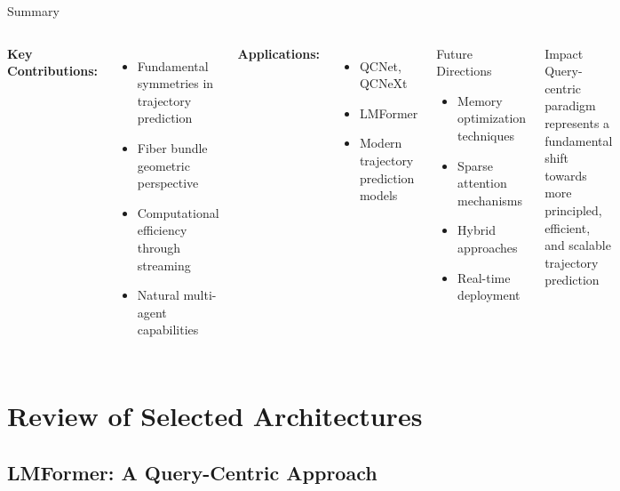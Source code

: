 \documentclass[10pt,aspectratio=169]{beamer}
\begin{document}
\begin{frame}{Summary}
\begin{columns}[T]
\textbf{Key Contributions:}
\begin{itemize}
    \item Fundamental symmetries in trajectory prediction
    \item Fiber bundle geometric perspective
    \item Computational efficiency through streaming
    \item Natural multi-agent capabilities
\end{itemize}

\textbf{Applications:}
\begin{itemize}
    \item QCNet, QCNeXt
    \item LMFormer
    \item Modern trajectory prediction models
\end{itemize}

\begin{block}{Future Directions}
\begin{itemize}
    \item Memory optimization techniques
    \item Sparse attention mechanisms
    \item Hybrid approaches
    \item Real-time deployment
\end{itemize}
\end{block}

\begin{alertblock}{Impact}
Query-centric paradigm represents a fundamental shift towards more principled, efficient, and scalable trajectory prediction
\end{alertblock}
\end{columns}
\end{frame}


\section{Review of Selected Architectures}

\subsection{LMFormer: A Query-Centric Approach}
\end{document}
